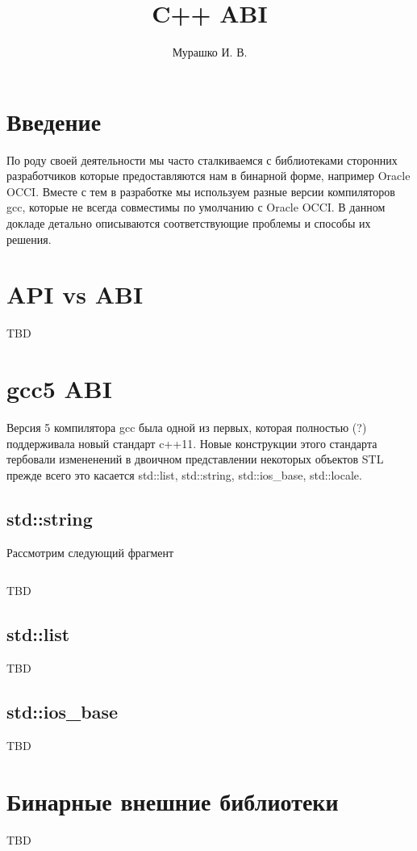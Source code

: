 \documentclass[14pt,a4paper]{article}
\title{C++ ABI}
\author{Мурашко И. В.}
\date{}
\begin{document}
\Russian

\maketitle

\section*{Введение}
По роду своей деятельности мы часто сталкиваемся с библиотеками сторонних 
разработчиков которые предоставляются нам в бинарной форме, например 
Oracle OCCI. Вместе с тем в разработке мы используем разные версии 
компиляторов gcc, которые не всегда совместимы по умолчанию с Oracle OCCI. 
В данном докладе детально описываются соответствующие проблемы и способы 
их решения. 

\section{API vs ABI}

TBD

\section{gcc5 ABI}

Версия 5 компилятора gcc была одной из первых, которая полностью (?)
поддерживала новый стандарт c++11. Новые конструкции этого стандарта
тербовали измененений в двоичном представлении некоторых объектов STL
прежде всего это касается std::list, std::string, std::ios\_base,
std::locale. 

\subsection{std::string}

Рассмотрим следующий фрагмент
\inputminted{c++}{./src/str.cpp}

TBD

\subsection{std::list}

TBD

\subsection{std::ios\_base}

TBD

\section{Бинарные внешние библиотеки}

TBD
\end{document}
